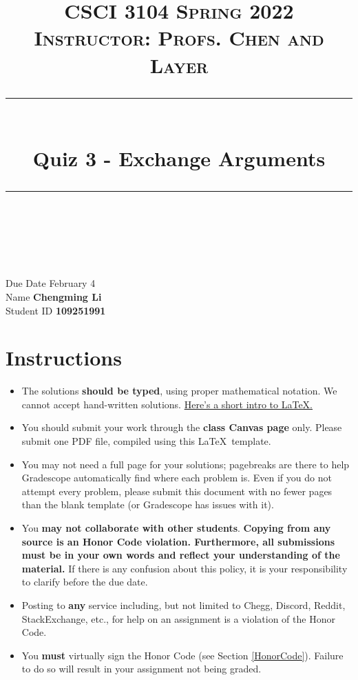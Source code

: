 \documentclass[11pt]{article}
\title{
\normalfont \normalsize 
\textsc{CSCI 3104 Spring 2022 \\ 
Instructor: Profs. Chen and Layer} \\
[10pt] 
\rule{\linewidth}{0.5pt} \\[6pt] 
\huge Quiz 3 - Exchange Arguments \\
\rule{\linewidth}{2pt}  \\[10pt]
}
\date{}
\theoremstyle{definition}
\theoremstyle{definition}
\theoremstyle{definition}
\begin{document}
\maketitle


\noindent
Due Date \dotfill February 4 \\
Name \dotfill \textbf{Chengming Li} \\
Student ID \dotfill \textbf{109251991} \\


\tableofcontents

\section{Instructions}
 \begin{itemize}
	\item The solutions \textbf{should be typed}, using proper mathematical notation. We cannot accept hand-written solutions. \href{http://ece.uprm.edu/~caceros/latex/introduction.pdf}{Here's a short intro to \LaTeX.}
	\item You should submit your work through the \textbf{class Canvas page} only. Please submit one PDF file, compiled using this \LaTeX \ template.
	\item You may not need a full page for your solutions; pagebreaks are there to help Gradescope automatically find where each problem is. Even if you do not attempt every problem, please submit this document with no fewer pages than the blank template (or Gradescope has issues with it).

	\item You \textbf{may not collaborate with other students}. \textbf{Copying from any source is an Honor Code violation. Furthermore, all submissions must be in your own words and reflect your understanding of the material.} If there is any confusion about this policy, it is your responsibility to clarify before the due date. 

	\item Posting to \textbf{any} service including, but not limited to Chegg, Discord, Reddit, StackExchange, etc., for help on an assignment is a violation of the Honor Code.

	\item You \textbf{must} virtually sign the Honor Code (see Section \ref{HonorCode}). Failure to do so will result in your assignment not being graded.
\end{itemize}
\end{document}
